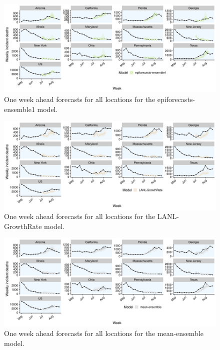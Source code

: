 \documentclass[
]{book}
\begin{document}
\begin{figure}
\includegraphics[width=1\linewidth]{../visualisation/chapter-5-results/scenario-baseline/APPENDIX-epiforecasts-ensemble1-forecasts} \caption{One week ahead forecasts for all locations for the epiforecasts-ensemble1 model.}\label{fig:predictions-epiforecasts}
\end{figure}

\begin{figure}
\includegraphics[width=1\linewidth]{../visualisation/chapter-5-results/scenario-baseline/APPENDIX-LANL-GrowthRate-forecasts} \caption{One week ahead forecasts for all locations for the LANL-GrowthRate model.}\label{fig:predictions-lanl-growthrate}
\end{figure}

\begin{figure}
\includegraphics[width=1\linewidth]{../visualisation/chapter-5-results/scenario-baseline/APPENDIX-mean-ensemble-forecasts} \caption{One week ahead forecasts for all locations for the mean-ensemble model.}\label{fig:predictions-mean-ensemble}
\end{figure}
\end{document}
